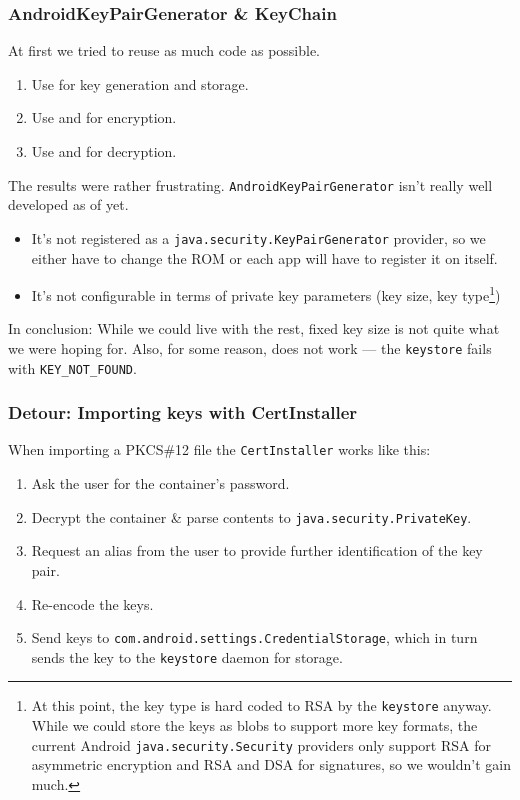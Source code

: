 \documentclass[a4paper]{scrartcl}
\begin{document}
		\subsubsection{AndroidKeyPairGenerator \& KeyChain}
			At first we tried to reuse as much code as possible.
			\begin{enumerate}
				\item Use  for key generation and storage.
				\item Use  and  for encryption.
				\item Use  and  for decryption.
			\end{enumerate}
			The results were rather frustrating. \texttt{AndroidKeyPairGenerator} isn't really well developed as of yet.
			\begin{itemize}
				\item It's not registered as a \texttt{java.security.KeyPairGenerator} provider, so we either have to change the ROM or each app will have to register it on itself.
				\item It's not configurable in terms of private key parameters (key size, key type\footnote{At this point, the key type is hard coded to RSA by the \texttt{keystore} anyway. While we could store the keys as blobs to support more key formats, the current Android \texttt{java.security.Security} providers only support RSA for asymmetric encryption and RSA and DSA for signatures, so we wouldn't gain much.})
			\end{itemize}
			In conclusion: While we could live with the rest, fixed key size is not quite what we were hoping for. Also, for some reason,  does not work --- the \texttt{keystore} fails with \texttt{KEY\_NOT\_FOUND}.

		\subsubsection*{Detour: Importing keys with CertInstaller}
			When importing a PKCS\#12 file the \texttt{CertInstaller} works like this:%
			\begin{enumerate}
				\item Ask the user for the container's password.
				\item Decrypt the container \& parse contents to \texttt{java.security.PrivateKey}.
				\item Request an alias from the user to provide further identification of the key pair.
				\item Re-encode the keys.
				\item Send keys to \texttt{com.android.settings.CredentialStorage}, which in turn sends the key to the \texttt{keystore} daemon for storage.
			\end{enumerate}
\end{document}
